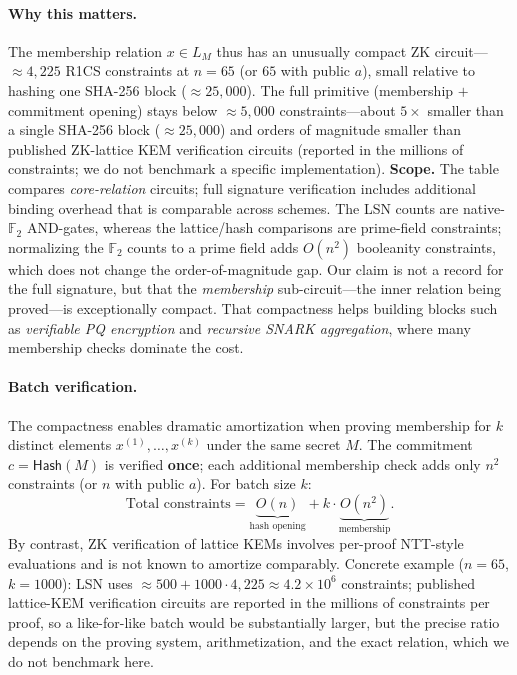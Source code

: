 \documentclass[11pt,a4paper]{article}
\theoremstyle{plain}
\theoremstyle{definition}
\newcommand{\F}{\mathbb{F}}
\begin{document}
\paragraph{Why this matters.} The membership relation $x \in L_M$ thus has an unusually compact ZK circuit---$\approx 4{,}225$ R1CS constraints at $n=65$ (or $65$ with public $a$), small relative to hashing one SHA-256 block ($\approx 25{,}000$). The full primitive (membership $+$ commitment opening) stays below $\approx 5{,}000$ constraints---about $5\times$ smaller than a single SHA-256 block ($\approx 25{,}000$) and orders of magnitude smaller than published ZK-lattice KEM verification circuits (reported in the millions of constraints; we do not benchmark a specific implementation). \textbf{Scope.} The table compares \emph{core-relation} circuits; full signature verification includes additional binding overhead that is comparable across schemes. The LSN counts are native-$\F_2$ AND-gates, whereas the lattice/hash comparisons are prime-field constraints; normalizing the $\F_2$ counts to a prime field adds $O(n^2)$ booleanity constraints, which does not change the order-of-magnitude gap. Our claim is not a record for the full signature, but that the \emph{membership} sub-circuit---the inner relation being proved---is exceptionally compact. That compactness helps building blocks such as \emph{verifiable PQ encryption} and \emph{recursive SNARK aggregation}, where many membership checks dominate the cost.

\paragraph{Batch verification.}
The compactness enables dramatic amortization when proving membership for $k$ distinct elements $x^{(1)},\dots,x^{(k)}$ under the same secret $M$. The commitment $c=\mathsf{Hash}(M)$ is verified \textbf{once}; each additional membership check adds only $n^2$ constraints (or $n$ with public $a$). For batch size $k$:
\[
\text{Total constraints} = \underbrace{O(n)}_{\text{hash opening}} + k \cdot \underbrace{O(n^2)}_{\text{membership}}.
\]
By contrast, ZK verification of lattice KEMs involves per-proof NTT-style evaluations and is not known to amortize comparably. Concrete example ($n=65$, $k=1000$): LSN uses $\approx 500 + 1000\cdot 4{,}225 \approx 4.2\times 10^6$ constraints; published lattice-KEM verification circuits are reported in the millions of constraints per proof, so a like-for-like batch would be substantially larger, but the precise ratio depends on the proving system, arithmetization, and the exact relation, which we do not benchmark here.
\end{document}
